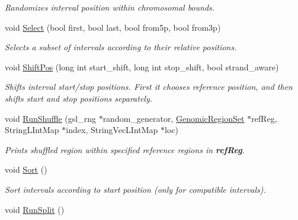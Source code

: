 \begin{CompactItemize}
\begin{CompactList}\small\item\em Randomizes interval position within chromosomal bounds. \item\end{CompactList}\item 
\hypertarget{classGenomicRegionBED_dec7408315765bbdb21465a26400422b}{
void \hyperlink{classGenomicRegionBED_dec7408315765bbdb21465a26400422b}{Select} (bool first, bool last, bool from5p, bool from3p)}
\label{classGenomicRegionBED_dec7408315765bbdb21465a26400422b}

\begin{CompactList}\small\item\em Selects a subset of intervals according to their relative positions. \item\end{CompactList}\item 
void \hyperlink{classGenomicRegionBED_fd2f05cec2af5186794f40f221e040b1}{ShiftPos} (long int start\_\-shift, long int stop\_\-shift, bool strand\_\-aware)
\begin{CompactList}\small\item\em Shifts interval start/stop positions. First it chooses reference position, and then shifts start and stop positions separately. \item\end{CompactList}\item 
\hypertarget{classGenomicRegionBED_f3793387aa335bf68042f9245bc5992d}{
void \hyperlink{classGenomicRegionBED_f3793387aa335bf68042f9245bc5992d}{RunShuffle} (gsl\_\-rng $\ast$random\_\-generator, \hyperlink{classGenomicRegionSet}{GenomicRegionSet} $\ast$refReg, StringLIntMap $\ast$index, StringVecLIntMap $\ast$loc)}
\label{classGenomicRegionBED_f3793387aa335bf68042f9245bc5992d}

\begin{CompactList}\small\item\em Prints shuffled region within specified reference regions in {\bf refReg}. \item\end{CompactList}\item 
\hypertarget{classGenomicRegionBED_fd1a61c04f76782abdc83074ae0f7bd3}{
void \hyperlink{classGenomicRegionBED_fd1a61c04f76782abdc83074ae0f7bd3}{Sort} ()}
\label{classGenomicRegionBED_fd1a61c04f76782abdc83074ae0f7bd3}

\begin{CompactList}\small\item\em Sort intervals according to start position (only for compatible intervals). \item\end{CompactList}\item 
\hypertarget{classGenomicRegionBED_bd3b8e4969c2ff2639eb344de7b224f9}{
void \hyperlink{classGenomicRegionBED_bd3b8e4969c2ff2639eb344de7b224f9}{RunSplit} ()}
\label{classGenomicRegionBED_bd3b8e4969c2ff2639eb344de7b224f9}


\end{CompactItemize}
